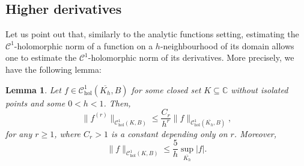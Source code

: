 \documentclass[10pt]{article}
\newtheorem{lemma}[theorem]{Lemma}
\newcommand{\C}{\mathbb{C}}
\begin{document}
\subsection{Higher derivatives}

Let us point out that, similarly to the analytic functions setting, estimating the $\mathscr C^1$-holomorphic norm of a function on a $h$-neighbourhood of its domain allows one to estimate the $\mathscr C^1$-holomorphic norm of its derivatives. More precisely, we have the following lemma:

\begin{lemma}
\label{lem:cauchy}
Let $f \in \mathscr C_{\text{hol}}^1(\overline{K_h},B)$ for some closed set $K \subseteq \C$ without isolated points and some $0 < h < 1$. Then,
\[ \|f^{(r)}\|_{\mathscr C^1_{\text{hol}}(K,B)} \leq \frac{C_r}{h^r} \|f\|_{\mathscr C^1_{\text{hol}}(\overline{K_h},B)},\]
for any $r \geq 1$, where $C_r > 1$ is a constant depending only on $r$. Moreover,
\[
\|f\|_{\mathscr C^1_{\text{hol}}(K,B)}\leq \frac{5}{h}\sup_{\overline{K_h}}|f|.
\]
\end{lemma}
\end{document}
